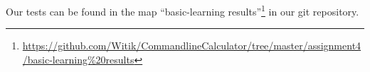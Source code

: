 \documentclass[11pt,a4paper]{article}
\begin{document}
Our tests can be found in the map ``basic-learning
results''\footnote{\url{https://github.com/Witik/CommandlineCalculator/tree/master/assignment4/basic-learning\%20results}}
in our git repository.



\end{document}
